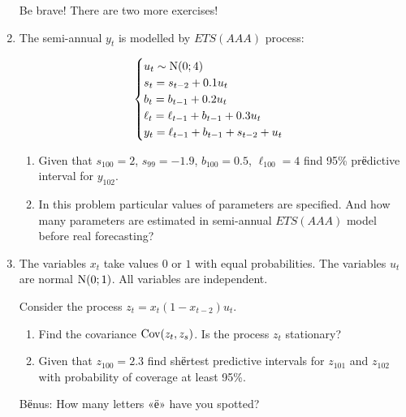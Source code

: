 \begin{enumerate}
    Be brave! There are two more exercises!

    \item The semi-annual $y_t$ is modelled by $ETS(AAA)$ process:
    
    \[
    \begin{cases}
        u_t \sim \mathrm{N}(0; 4) \\
        s_t = s_{t-2} + 0.1 u_t \\
        b_t = b_{t-1} + 0.2 u_t \\
        \ell_t = \ell_{t-1} + b_{t-1} + 0.3 u_t \\
        y_t = \ell_{t-1} + b_{t-1} + s_{t-2} + u_t \\
    \end{cases}    
    \]

    \begin{enumerate}
        \item Given that $s_{100} = 2$, $s_{99} = -1.9$, $b_{100} = 0.5$, $\ell_{100} = 4$ find 95\% prёdictive interval for $y_{102}$. 
        \item In this problem particular values of parameters are specified. And how many parameters are estimated in semi-annual $ETS(AAA)$ model before real forecasting?
    \end{enumerate}

    \item The variables $x_t$ take values $0$ or $1$ with equal probabilities.
    The variables $u_t$ are normal $\mathrm{N}(0; 1)$. All variables are independent.
    
    Consider the process  $z_t = x_t (1-x_{t-2}) u_t$.

    \begin{enumerate}
        \item Find the covariance $\operatorname{Cov}(z_t, z_s)$. Is the process $z_t$ stationary?
        \item Given that $z_{100} = 2.3$ find shёrtest predictive intervals for $z_{101}$ and $z_{102}$ with probability of coverage at least 95\%.
    \end{enumerate}

    \item[Bёnus:] How many letters «ё» have you spotted?
    
 
\end{enumerate}
